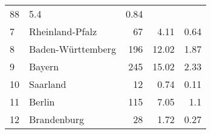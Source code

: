 \begin{longtable}{lXrrr}
       \num{88} &
       \num[round-mode=places,round-precision=2]{5,4} &
         \num[round-mode=places,round-precision=2]{0,84} \\

     7 &
     \multicolumn{1}{X}{ Rheinland-Pfalz   } &


       \num{67} &
       \num[round-mode=places,round-precision=2]{4,11} &
         \num[round-mode=places,round-precision=2]{0,64} \\

     8 &
     \multicolumn{1}{X}{ Baden-Württemberg   } &


       \num{196} &
       \num[round-mode=places,round-precision=2]{12,02} &
         \num[round-mode=places,round-precision=2]{1,87} \\

     9 &
     \multicolumn{1}{X}{ Bayern   } &


       \num{245} &
       \num[round-mode=places,round-precision=2]{15,02} &
         \num[round-mode=places,round-precision=2]{2,33} \\

     10 &
     \multicolumn{1}{X}{ Saarland   } &


       \num{12} &
       \num[round-mode=places,round-precision=2]{0,74} &
         \num[round-mode=places,round-precision=2]{0,11} \\

     11 &
     \multicolumn{1}{X}{ Berlin   } &


       \num{115} &
       \num[round-mode=places,round-precision=2]{7,05} &
         \num[round-mode=places,round-precision=2]{1,1} \\

     12 &
     \multicolumn{1}{X}{ Brandenburg   } &


       \num{28} &
       \num[round-mode=places,round-precision=2]{1,72} &
         \num[round-mode=places,round-precision=2]{0,27} \\


\end{longtable}
